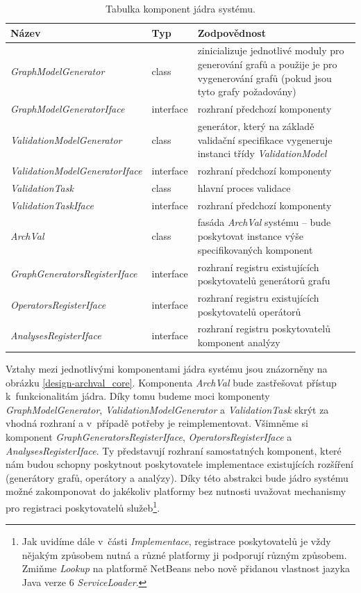 \begin{table}
  \caption{Tabulka komponent jádra systému. \label{design-archval_core_components}}
  \begin{center}
    \begin{tabular}{ | l | l | p{7.5cm} | }
      \hline
      \textbf{Název} & \textbf{Typ} & \textbf{Zodpovědnost} \\
      \hline
      \hline
      \emph{GraphModelGenerator} & class & zinicializuje jednotlivé moduly pro generování grafů a použije je pro vygenerování grafů (pokud jsou tyto grafy požadovány) \\ \hline
      \emph{GraphModelGeneratorIface} & interface & rozhraní předchozí komponenty \\ \hline
      \emph{ValidationModelGenerator} & class & generátor, který na základě validační specifikace vygeneruje instanci třídy \mbox{\emph{ValidationModel}} \\ \hline
      \emph{ValidationModelGeneratorIface} & interface & rozhraní předchozí komponenty \\ \hline
      \emph{ValidationTask} & class & hlavní proces validace \\ \hline
      \emph{ValidationTaskIface} & interface & rozhraní předchozí komponenty \\ \hline
      \hline
      \emph{ArchVal} & class & fasáda \emph{ArchVal} systému -- bude poskytovat instance výše specifikovaných komponent \\ \hline
      \hline
      \emph{GraphGeneratorsRegisterIface} & interface & rozhraní registru existujících poskytovatelů generátorů grafu \\ \hline
      \emph{OperatorsRegisterIface} & interface & rozhraní registru existujících poskytovatelů operátorů \\ \hline
      \emph{AnalysesRegisterIface} & interface & rozhraní registru poskytovatelů komponent analýzy \\ \hline
    \end{tabular}
  \end{center}

\end{table}

Vztahy mezi jednotlivými komponentami jádra systému jsou znázorněny na obrázku \ref{design-archval_core}. Komponenta \emph{ArchVal} bude zastřešovat přístup k~funkcionalitám jádra. Díky tomu budeme moci komponenty \emph{GraphModelGenerator}, \emph{ValidationModelGenerator} a \emph{ValidationTask} skrýt za vhodná rozhraní a v~případě potřeby je reimplementovat. Všimněme si komponent \emph{GraphGeneratorsRegisterIface}, \emph{OperatorsRegisterIface} a \emph{AnalysesRegisterIface}. Ty představují rozhraní samostatných komponent, které nám budou schopny poskytnout poskytovatele implementace existujících rozšíření (generátory grafů, operátory a analýzy). Díky této abstrakci bude jádro systému možné zakomponovat do jakékoliv platformy bez nutnosti uvažovat mechanismy pro registraci poskytovatelů služeb\footnote{Jak uvidíme dále v~části \emph{Implementace}, registrace poskytovatelů je vždy nějakým způsobem nutná a různé platformy ji podporují různým způsobem. Zmiňme \emph{Lookup} na platformě NetBeans nebo nově přidanou vlastnost jazyka Java verze 6 \emph{ServiceLoader}.}.

